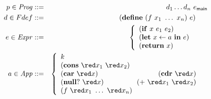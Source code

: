 
\small
\begin{eqnarray*}
   p \in \mathit{Prog} & ::= & d_1 \ldots d_n \,\, e_\mainpgm \\
    d \in Fdef & ::= & (\DEFINE\,\, (f\,\, 
    x_1 \,\, \ldots \,\, x_n)\,\,
    e) 
    \hspace{1.7em} \mbox{} \\
e \in \mathit{Expr} & ::= &
\left\{\begin{array}{lll}
       (\SIF\,\, x\,\, e_1\,\, e_2) && \mbox{} \\  
       (\LET\,\, x \leftarrow a\,\, \IN\,\, e) && \mbox{} \\
       (\RETURN\,\, x) && \mbox{}
    \end{array}\right. \\
a \in \mathit{App} & ::= &
\left\{\begin{array}{lrl}
       k && \mbox{}\\
       (\CONS\,\, {\red x_1}\,\, {\red x_2}) && \mbox{} \\ 
       (\CAR\,\, {\red x)} &  (\CDR\,\, {\red x)} & \mbox{} \\ 
       (\NULLQ\,\, {\red x}) & (\PRIM\,\, {\red x_1}\,\, {\red x_2}) & \mbox{} \\ 
       \multicolumn{2}{l}{(f\,\,{\red  x_1}\,\,\ldots\,\, {\red x_n})} 
            & \mbox{} 
    \end{array}\right.
\end{eqnarray*}


